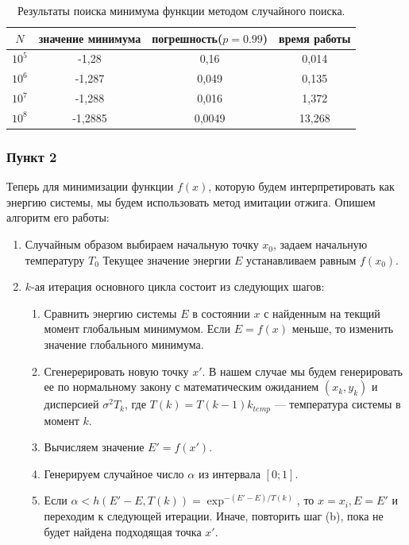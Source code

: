\documentclass[oneside, final, 12pt]{article}
\begin{document}
	\begin{table}[h!]
	\begin{center}
		\begin{tabular}{|c|c|c|c|}
			\hline $N$ & значение минимума & погрешность($p=0.99$) & время работы \\ \hline
				$10^5$ & -1,28 & 0,16 & 0,014 \\ \hline
				$10^6$ & -1,287 & 0,049 & 0,135 \\ \hline
				$10^7$ & -1,288 & 0,016 & 1,372 \\ \hline
				$10^8$ & -1,2885 & 0,0049 & 13,268 \\ \hline
		\end{tabular}
		\caption{Результаты поиска минимума функции методом случайного поиска.}
		\label{sample_table}
	\end{center}
	\end{table}
	
\newpage
\subsubsection{Пункт 2}   

	Теперь для минимизации функции $f(x)$, которую будем интерпретировать как энергию системы, 
	мы будем использовать метод имитации отжига. Опишем алгоритм его работы: 
	\begin{enumerate}
		\item Случайным образом выбираем начальную точку $x_0$, задаем начальную температуру $T_0$
			Текущее значение энергии $E$ устанавливаем равным $f(x_0)$.
		\item $k$-ая итерация основного цикла состоит из следующих шагов:
			\begin{enumerate}
				\item Сравнить энергию системы $E$ в состоянии $x$ с найденным на текщий 
						момент глобальным минимумом. Если $E=f(x)$ меньше, то изменить значение глобального 
						минимума.
				\item Сгенерерировать новую точку $x'$. В нашем случае мы будем генерировать ее по нормальному 
						закону с математическим ожиданием $(x_k,y_k)$ и дисперсией $\sigma^2T_k$, 
						где $T(k)= T(k-1) k_{temp}$ --- температура системы в момент $k$.
				\item Вычисляем значение $E'=f(x')$.
				\item Генерируем случайное число $\alpha$ из интервала $[0;1].$
				\item Если $\alpha < h(E'-E,T(k)) = \exp^{-(E'-E)\slash T(k)} $, то $x=x_i, E= E'$ и переходим к 
						следующей итерации. Иначе, повторить шаг (b), пока не будет найдена подходящая точка
						$x'$.
			\end{enumerate}
	\end{enumerate}
\end{document}
